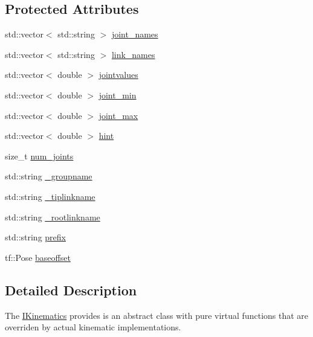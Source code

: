 \subsection*{Protected Attributes}
\begin{DoxyCompactItemize}
\item 
std\-::vector$<$ std\-::string $>$ \hyperlink{classIKinematics_abe955106c03418e9280763a85275ce0f}{joint\-\_\-names}
\item 
std\-::vector$<$ std\-::string $>$ \hyperlink{classIKinematics_a08df4ded5de908518e37687ccffe833c}{link\-\_\-names}
\item 
std\-::vector$<$ double $>$ \hyperlink{classIKinematics_a93debe94f7533c89c9c5de92159ac0c7}{jointvalues}
\item 
std\-::vector$<$ double $>$ \hyperlink{classIKinematics_ab061c2931468c4717f7cff67b697d364}{joint\-\_\-min}
\item 
std\-::vector$<$ double $>$ \hyperlink{classIKinematics_a4422f638d9b33ef9ccc9837ac8c1d76d}{joint\-\_\-max}
\item 
std\-::vector$<$ double $>$ \hyperlink{classIKinematics_a7e8f1a113eafba9c64ab73a8cb279924}{hint}
\item 
size\-\_\-t \hyperlink{classIKinematics_aabe89b2b82b30cdbb97545079d743222}{num\-\_\-joints}
\item 
std\-::string \hyperlink{classIKinematics_a77e5652ef78f21df82a7778e814ad234}{\-\_\-groupname}
\item 
std\-::string \hyperlink{classIKinematics_a88100365db2c65ae406c6727861261f3}{\-\_\-tiplinkname}
\item 
std\-::string \hyperlink{classIKinematics_a8e6174990e9a54967482dc0a99311976}{\-\_\-rootlinkname}
\item 
std\-::string \hyperlink{classIKinematics_a62baaf78436911eca42896cad4b5c911}{prefix}
\item 
tf\-::\-Pose \hyperlink{classIKinematics_aa599f7938cbf1c9b422a6d4d50e8e1a9}{baseoffset}
\end{DoxyCompactItemize}


\subsection{Detailed Description}
The \hyperlink{classIKinematics}{I\-Kinematics} provides is an abstract class with pure virtual functions that are overriden by actual kinematic implementations. 

